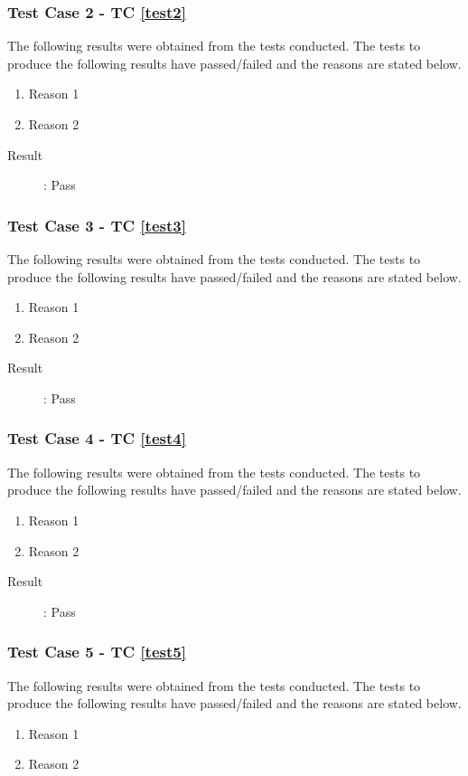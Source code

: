 \documentclass{article}
\begin{document}
\subsubsection{Test Case 2 - TC \ref{test2}}
The following results were obtained from the tests conducted. The tests to produce the
following results have passed/failed and the reasons are stated below.
\begin{enumerate}
	\item Reason 1
	\item Reason 2
\end{enumerate}

\begin{description}
	\item [Result]: Pass 
\end{description}

\subsubsection{Test Case 3 - TC \ref{test3}}
The following results were obtained from the tests conducted. The tests to produce the
following results have passed/failed and the reasons are stated below.
\begin{enumerate}
	\item Reason 1
	\item Reason 2
\end{enumerate}

\begin{description}
	\item [Result]: Pass 
\end{description}

\subsubsection{Test Case 4 - TC \ref{test4}}
The following results were obtained from the tests conducted. The tests to produce the
following results have passed/failed and the reasons are stated below.
\begin{enumerate}
	\item Reason 1
	\item Reason 2
\end{enumerate}

\begin{description}
	\item [Result]: Pass 
\end{description}

\subsubsection{Test Case 5 - TC \ref{test5}}
The following results were obtained from the tests conducted. The tests to produce the
following results have passed/failed and the reasons are stated below.
\begin{enumerate}
	\item Reason 1
	\item Reason 2
\end{enumerate}
\end{document}

